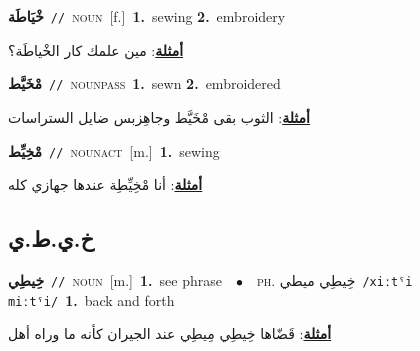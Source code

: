 \documentclass[10pt,a4paper,twoside]{article} %
\begin{document}
\begin{multicols}{2}
{\setlength\topsep{0pt}\textbf{\foreignlanguage{arabic}{خْيَاطَة}}\ {\color{gray}\texttt{//}\color{black}}\ \textsc{noun}\ [f.]\ \textbf{1.}~sewing  \textbf{2.}~embroidery\  \begin{flushright}\color{gray}\foreignlanguage{arabic}{\textbf{\underline{\foreignlanguage{arabic}{أمثلة}}}: مين علمك كار الخْياطَة؟}\end{flushright}\color{black}} \vspace{2mm}

{\setlength\topsep{0pt}\textbf{\foreignlanguage{arabic}{مْخَيَّط}}\ {\color{gray}\texttt{//}\color{black}}\ \textsc{noun\textunderscore pass}\ \textbf{1.}~sewn  \textbf{2.}~embroidered\  \begin{flushright}\color{gray}\foreignlanguage{arabic}{\textbf{\underline{\foreignlanguage{arabic}{أمثلة}}}: الثوب بقى مْخَيَّط وجاهِزبس ضايل الستراسات}\end{flushright}\color{black}} \vspace{2mm}

{\setlength\topsep{0pt}\textbf{\foreignlanguage{arabic}{مْخِيِّط}}\ {\color{gray}\texttt{//}\color{black}}\ \textsc{noun\textunderscore act}\ [m.]\ \textbf{1.}~sewing\  \begin{flushright}\color{gray}\foreignlanguage{arabic}{\textbf{\underline{\foreignlanguage{arabic}{أمثلة}}}: أنا مْخِيِّطِة عندها جهازي كله}\end{flushright}\color{black}} \vspace{2mm}

\vspace{-3mm}
\subsection*{\color{blue}\foreignlanguage{arabic}{خ.ي.ط.ي}\color{blue}{}} 

{\setlength\topsep{0pt}\textbf{\foreignlanguage{arabic}{خِيطِي}}\ {\color{gray}\texttt{//}\color{black}}\ \textsc{noun}\ [m.]\ \textbf{1.}~see phrase\ \ $\bullet$\ \ \textsc{ph.} \color{gray} \foreignlanguage{arabic}{خِيطِي ميطي}\color{black}\ {\color{gray}\texttt{/{\sffamily xiːtˤi miːtˤi}/}\color{black}}\ \textbf{1.}~back and forth\  \begin{flushright}\color{gray}\foreignlanguage{arabic}{\textbf{\underline{\foreignlanguage{arabic}{أمثلة}}}: قَضّاها خِيطِي مِيطِي عند الجيران كأنه ما وراه أهل}\end{flushright}\color{black}} \vspace{2mm}


\end{multicols}
\end{document}
